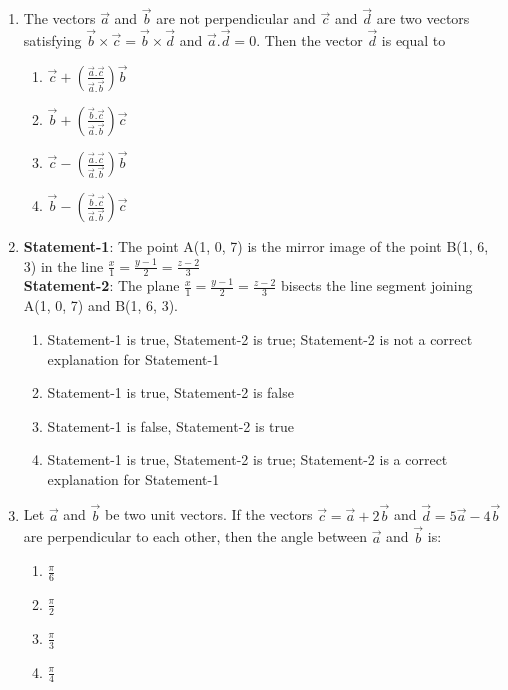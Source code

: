 \begin{enumerate}[label=\arabic*.,ref=\thesubsection.\theenumi]
\item The vectors $\overrightarrow{a}$ and $\overrightarrow{b}$ are not perpendicular and $\overrightarrow{c}$  and $\overrightarrow{d}$ are two vectors satisfying $\overrightarrow{b} \times \overrightarrow{c} = \overrightarrow{b} \times \overrightarrow{d}$ and $\overrightarrow{a}.\overrightarrow{d} = 0$. Then the vector $\overrightarrow{d}$ is equal to
\begin{enumerate}
\item $\overrightarrow{c} + (\frac{\overrightarrow{a}.\overrightarrow{c}}{\overrightarrow{a}.\overrightarrow{b}})\overrightarrow{b}$
\item $\overrightarrow{b} + (\frac{\overrightarrow{b}.\overrightarrow{c}}{\overrightarrow{a}.\overrightarrow{b}})\overrightarrow{c}$
\item $\overrightarrow{c} - (\frac{\overrightarrow{a}.\overrightarrow{c}}{\overrightarrow{a}.\overrightarrow{b}})\overrightarrow{b}$
\item $\overrightarrow{b} - (\frac{\overrightarrow{b}.\overrightarrow{c}}{\overrightarrow{a}.\overrightarrow{b}})\overrightarrow{c}$
\end{enumerate}

\item \textbf{Statement-1}: The point A(1, 0, 7) is the mirror image of the point B(1, 6, 3) in the line $\frac{x}{1} = \frac{y-1}{2} = \frac{z-2}{3}$\\
\textbf{Statement-2}: The plane $\frac{x}{1} = \frac{y-1}{2} = \frac{z-2}{3}$ bisects the line segment joining A(1, 0, 7) and B(1, 6, 3).
\begin{enumerate}
\item Statement-1 is true, Statement-2 is true; Statement-2 is not a correct explanation for Statement-1
\item Statement-1 is true, Statement-2 is false
\item Statement-1 is false, Statement-2 is true
\item Statement-1 is true, Statement-2 is true; Statement-2 is a correct explanation for Statement-1
\end{enumerate}

\item Let $\overrightarrow{a}$ and $\overrightarrow{b}$ be two unit vectors. If the vectors $\overrightarrow{c}=\overrightarrow{a}+2\overrightarrow{b}$ and $\overrightarrow{d}=5\overrightarrow{a}-4\overrightarrow{b}$ are perpendicular to each other, then the angle between $\overrightarrow{a}$ and $\overrightarrow{b}$ is:
\begin{enumerate}
\item $\frac{\pi}{6}$
\item $\frac{\pi}{2}$
\item $\frac{\pi}{3}$
\item $\frac{\pi}{4}$
\end{enumerate}


\end{enumerate}
